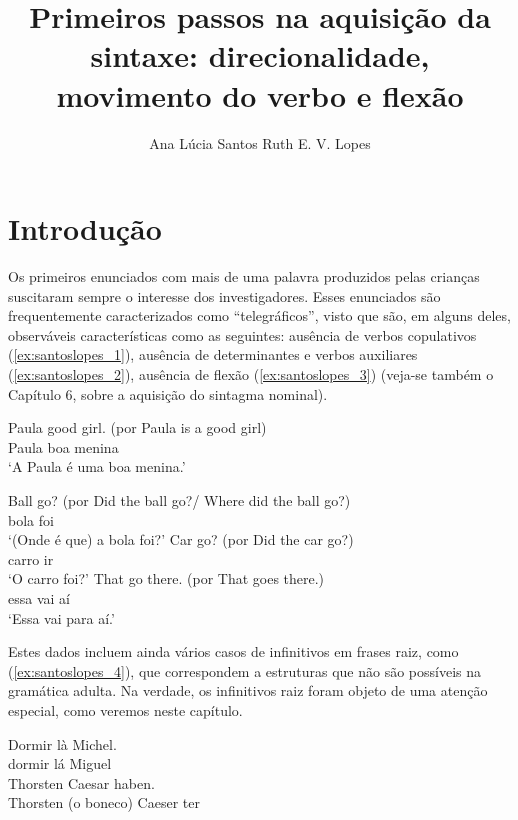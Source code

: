 \documentclass[output=paper]{LSP/langsci}
\author{Ana Lúcia Santos\affiliation{Universidade de Lisboa, Faculdade de Letras, Centro de Linguística}\lastand 
Ruth E. V. Lopes\affiliation{Universidade Estadual de Campinas}
}
\title{Primeiros passos na aquisição da sintaxe: direcionalidade, movimento do verbo e flexão}
\begin{document}
\section{Introdução}
\label{sec:santoslopes_intro}

Os primeiros enunciados com mais de uma palavra produzidos pelas crianças suscitaram sempre o interesse dos investigadores. Esses enunciados são frequentemente caracterizados como “telegráficos”, visto que são, em alguns deles, observáveis características como as seguintes: ausência de verbos copulativos (\ref{ex:santoslopes_1}), ausência de determinantes e verbos auxiliares (\ref{ex:santoslopes_2}), ausência de flexão (\ref{ex:santoslopes_3}) (veja-se também o Capítulo 6, sobre a aquisição do sintagma nominal).

\ea\label{ex:santoslopes_1}
\gll Paula good girl. (por Paula is a good girl)\\
Paula boa menina\\
\glt `A Paula é uma boa menina.'
\z

\ea\label{ex:santoslopes_2}
\ea\label{ex:santoslopes_2a}
\gll Ball go? (por Did the ball go?/ Where did the ball go?)\\
bola foi\\
\glt `(Onde é que) a bola foi?'
\ex\label{ex:santoslopes_2b}
\gll Car go? (por Did the car go?) \\
carro ir\\
\glt `O carro foi?'
\zl
\ea\label{ex:santoslopes_3}
\gll That go there. (por That goes there.) \\
essa vai aí\\
\glt `Essa vai para aí.'
\z

Estes dados incluem ainda vários casos de infinitivos em frases raiz, como (\ref{ex:santoslopes_4}), que correspondem a estruturas que não são possíveis na gramática adulta. Na verdade, os infinitivos raiz foram objeto de uma atenção especial, como veremos neste capítulo.

\ea\label{ex:santoslopes_4}
\ea\label{ex:santoslopes_4a}
\gll Dormir là Michel.\\
dormir lá Miguel\\
\ex\label{ex:santoslopes_4b}
\gll Thorsten Caesar haben.\\
{Thorsten (o boneco)} Caeser ter\\
\zl
\end{document}
